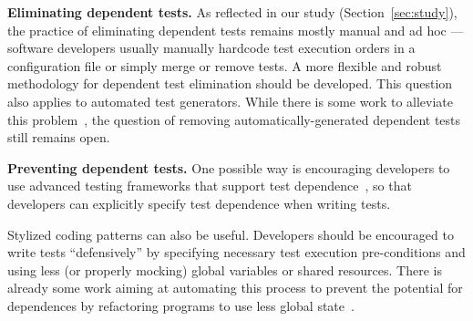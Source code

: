 \noindent \textbf{{Eliminating dependent tests.}}
As reflected in our study (Section~\ref{sec:study}),
the practice of eliminating dependent tests
remains mostly manual and ad hoc --- software developers
usually manually hardcode test
execution orders in a configuration file or
simply merge or remove tests.
A more flexible and robust methodology for
dependent test elimination should be developed.
This question also applies to automated test generators.
While there is some work to alleviate
this problem~\cite{RobinsonEPAL2011,fraseretal:ISSTA:2011}, the question
of removing automatically-generated dependent tests
still remains open.






\vspace{1mm}


\noindent \textbf{{Preventing dependent tests.}}
One possible way is encouraging developers to
use advanced testing frameworks that support test dependence~\cite{testng},
so that developers can explicitly specify test
dependence when writing tests.

Stylized coding patterns can also be useful. Developers
should be encouraged to write tests ``defensively'' by
specifying necessary test execution pre-conditions and
using less (or properly mocking) global variables or shared resources. 
There is already some work aiming at automating this
process to prevent the potential
for dependences by refactoring programs to use
less global state~\cite{wlokaetal:FSE:2009}. 


